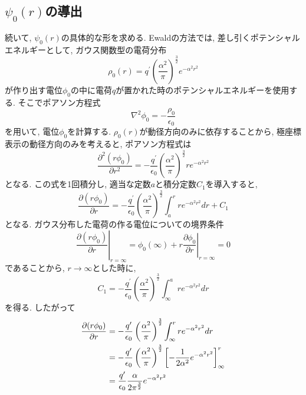 \subsection{$\psi_{0}(r)$の導出}
続いて, $\psi_{0}(r)$の具体的な形を求める.
Ewaldの方法では, 差し引くポテンシャルエネルギーとして, ガウス関数型の電荷分布
\begin{equation}
    \rho_{0}(r)
  =
    q^{\prime} \left(\frac{\alpha^{2}}{\pi}\right)^{\frac{3}{2}} e^{-\alpha^{2} r^{2}}
  \label{eq:Ewald11}
\end{equation}
が作り出す電位$\phi_{0}$の中に電荷$q$が置かれた時のポテンシャルエネルギーを使用する.
そこでポアソン方程式
\begin{equation}
 \nabla^{2} \phi_{0} = - \frac{\rho_{0}}{\epsilon_{0}}
 \label{eq:Ewald12}
\end{equation}
を用いて, 電位$\phi_{0}$を計算する.
$\rho_{0}(r)$が動径方向のみに依存することから, 極座標表示の動径方向のみを考えると, ポアソン方程式は
\begin{equation}
    \frac{\partial^{2} (r \phi_{0})}{\partial r^{2}}
  =
   -\frac{q^{\prime}}{\epsilon_{0}}
    \left( \frac{\alpha^{2}}{\pi} \right)^{\frac{3}{2}} r e^{-\alpha^{2} r^{2}}
\label{eq:Ewald13}
\end{equation}
となる. この式を1回積分し, 適当な定数$a$と積分定数$C_{1}$を導入すると,
\begin{equation}
    \frac{\partial (r \phi_{0})}{\partial r}
  =
   -\frac{q^{\prime}}{\epsilon_{0}} \left( \frac{\alpha^{2}}{\pi} \right)^{\frac{3}{2}}
    \int_{a}^{r} r e^{-\alpha^{2} r^{2}} dr + C_{1}
\label{eq:Ewald14}
\end{equation}
となる. ガウス分布した電荷の作る電位についての境界条件
\begin{equation}
    \left.\frac{\partial (r \phi_{0})}{\partial r} \right|_{r=\infty}
  =
    \phi_{0}(\infty) + r \left.\frac{\partial \phi_{0}}{\partial r} \right|_{r=\infty}
  =
    0
\label{eq:Ewald15}
\end{equation}
であることから, $r \to \infty$とした時に,
\begin{equation}
    C_{1}
  =
    -\frac{q^{\prime}}{\epsilon_{0}} \left(\frac{\alpha^{2}}{\pi}\right)^{\frac{3}{2}}
     \int_{\infty}^{a} r e^{- \alpha^{2} r^{2}} dr
  \label{eq:Ewald16}
\end{equation}
を得る. したがって
\begin{align}
     \frac{\partial (r \phi_{0})}{\partial r}
 &=
    -\frac{q^{\prime}}{\epsilon_{0}} \left( \frac{\alpha^{2}}{\pi} \right)^{\frac{3}{2}}
     \int_{\infty}^{r} r e^{-\alpha ^{2} r^{2}} dr
 \notag
 \\
 &=
   -\frac{q^{\prime}}{\epsilon_{0}} \left( \frac{\alpha^{2}}{\pi} \right)^{\frac{3}{2}}
    \left[
          -\frac{1}{2\alpha^{2}}e^{-\alpha^2 r^{2}}
    \right]^{r}_{\infty}
 \notag
 \\
 &=
    \frac{q^{\prime}}{\epsilon_{0}} \frac{\alpha}{2 \pi^{\frac{3}{2}}} e^{- \alpha^{2} r^{2}}
 \label{eq:Ewald17}
\end{align}
